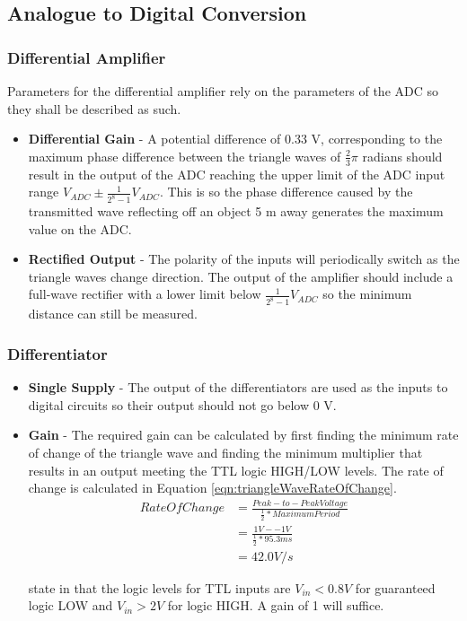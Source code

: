 \subsection{Analogue to Digital Conversion}

\subsubsection{Differential Amplifier}
Parameters for the differential amplifier rely on the parameters of the ADC so they shall be described as such. 
\begin{itemize}
    \item \textbf{Differential Gain} - A potential difference of 0.33 V, corresponding to the maximum phase difference between the triangle waves of $\frac{2}{3}\pi$ radians should result in the output of the ADC reaching the upper limit of the ADC input range $V_{ADC} \pm \frac{1}{2^{8}-1}V_{ADC}$.
    This is so the phase difference caused by the transmitted wave reflecting off an object 5 m away generates the maximum value on the ADC.
    
    \item \textbf{Rectified Output} - The polarity of the inputs will periodically switch as the triangle waves change direction.
    The output of the amplifier should include a full-wave rectifier with a lower limit below $\frac{1}{2^{8}-1}V_{ADC}$ so the minimum distance can still be measured.
\end{itemize}

\subsubsection{Differentiator}
\begin{itemize}
    \item \textbf{Single Supply} - The output of the differentiators are used as the inputs to digital circuits so their output should not go below 0 V.

    \item \textbf{Gain} - The required gain can be calculated by first finding the minimum rate of change of the triangle wave and finding the minimum multiplier that results in an output meeting the TTL logic HIGH/LOW levels.
    The rate of change is calculated in Equation \ref{eqn:triangleWaveRateOfChange}.
    \begin{equation}
        \begin{split}
            Rate Of Change  &= \frac{Peak-to-Peak Voltage}{\frac{1}{2}*Maximum Period}\\
                            &= \frac{1 V - -1V}{\frac{1}{2}*95.3 ms}\\
                            &= 42.0 V/s
        \end{split}
        \label{eqn:triangleWaveRateOfChange}
    \end{equation} 

    \citeauthor{TTLLogicLevels} state in  that the logic levels for TTL inputs are $V_{in} < 0.8 V$ for guaranteed logic LOW and $V_{in} > 2 V$ for logic HIGH.
    A gain of 1 will suffice.

\end{itemize}
